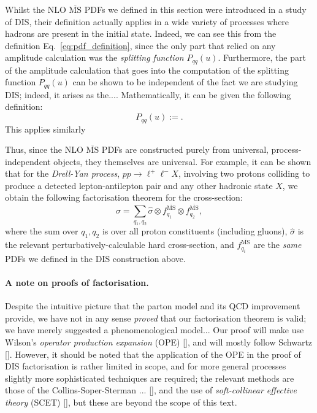 \documentclass[withindex,glossary]{cam-thesis}
\begin{document}
Whilst the NLO $\overline{\text{MS}}$ PDFs we defined in this section were introduced in a study of DIS, their definition actually applies in a wide variety of processes where hadrons are present in the initial state. Indeed, we can see this from the definition Eq.~\eqref{eq:pdf_definition}, since the only part that relied on any amplitude calculation was the \textit{splitting function} $P_{qq}(u)$. Furthermore, the part of the amplitude calculation that goes into the computation of the splitting function $P_{qq}(u)$ can be shown to be independent of the fact we are studying DIS; indeed, it arises as the.... Mathematically, it can be given the following definition:
\begin{equation}
P_{qq}(u) := .
\end{equation}
This applies similarly 

Thus, since the NLO $\overline{\text{MS}}$ PDFs are constructed purely from universal, process-independent objects, they themselves are universal. For example, it can be shown that for the \textit{Drell-Yan process}, $pp \rightarrow \ell^+ \ell^- X$, involving two protons colliding to produce a detected lepton-antilepton pair and any other hadronic state $X$, we obtain the following factorisation theorem for the cross-section:
\begin{equation}
\sigma = \sum_{q_1, q_2} \hat{\sigma} \otimes f_{q_1}^{\overline{\text{MS}}} \otimes f_{q_2}^{\overline{\text{MS}}},
\end{equation} 
where the sum over $q_1, q_2$ is over all proton constituents (including gluons), $\hat{\sigma}$ is the relevant perturbatively-calculable hard cross-section, and $f_{q_i}^{\overline{\text{MS}}}$ are the \textit{same} PDFs we defined in the DIS construction above. 

\paragraph{A note on proofs of factorisation.} Despite the intuitive picture that the parton model and its QCD improvement provide, we have not in any sense \textit{proved} that our factorisation theorem is valid; we have merely suggested a phenomenological model... Our proof will make use Wilson's \textit{operator production expansion} (OPE) [], and will mostly follow Schwartz []. However, it should be noted that the application of the OPE in the proof of DIS factorisation is rather limited in scope, and for more general processes slightly more sophisticated techniques are required; the relevant methods are those of the Collins-Soper-Sterman ... [], and the use of \textit{soft-collinear effective theory} (SCET) [], but these are beyond the scope of this text.
\end{document}
